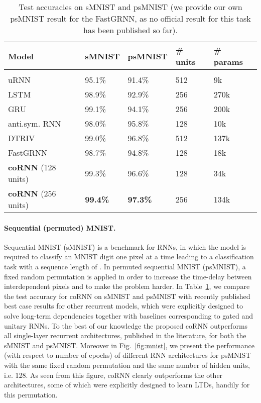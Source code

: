 \documentclass{article} \usepackage{iclr2021_conference,times}
\newcommand{\fref}[1] {Fig.~\ref{#1}}
\newcommand{\Tref}[1]{Table~\ref{#1}}
\begin{document}
\begin{table}[h!]
\caption{Test accuracies on sMNIST and psMNIST (we provide our own psMNIST result for the FastGRNN, as no official result for this task has been published so far).}
\label{tab:mnist}
\begin{center}
\begin{tabular}{lllll}
Model & sMNIST &  psMNIST &  \# units & { \# params}
\\ \hline \\
uRNN \citep{urnn} & 95.1\%& 91.4\% & 512 & 9k\\
LSTM \citep{scornn} &98.9\% & 92.9\% & 256 & 270k \\
GRU \citep{GRU_results} & 99.1\%&94.1\% & 256& 200k\\
anti.sym. RNN \citep{anti}  & 98.0\% & 95.8\% & 128 & 10k\\
DTRIV \citep{dtriv}& 99.0\%& 96.8\% &512 & 137k \\
FastGRNN \citep{fastrnn} & 98.7\% & 94.8\% & 128 & 18k\\
\textbf{coRNN} (128 units) &99.3\% & 96.6\%&128& 34k\\
\textbf{coRNN} (256 units)&\bf{99.4}\%& \bf{97.3}\%&256& 134k\\
\end{tabular}
\end{center}
\end{table}
\paragraph{Sequential (permuted) MNIST.}
Sequential MNIST (sMNIST) \citep{seq_mnist} is a benchmark for RNNs, in which the model is required to classify an MNIST \citep{mnist} digit one pixel at a time leading to a classification task with a sequence length of . In permuted sequential MNIST (psMNIST), a fixed random permutation is applied in order to increase the time-delay between interdependent pixels and to make the problem harder. In \Tref{tab:mnist}, we compare the test accuracy for coRNN on sMNIST and psMNIST with recently published best case results for other recurrent models, which were explicitly designed to solve long-term dependencies together with baselines corresponding to gated and unitary RNNs. To the best of our knowledge the proposed coRNN outperforms all single-layer recurrent architectures, published in the literature, for both the sMNIST and psMNIST. 
Moreover in \fref{fig:mnist}, we present the performance (with respect to number of epochs) of different RNN architectures for psMNIST with the same fixed random permutation and the same number of hidden units, i.e. 128. As seen from this figure, coRNN clearly outperforms the other architectures, some of which were explicitly designed to learn LTDs, handily for this permutation.
\end{document}

